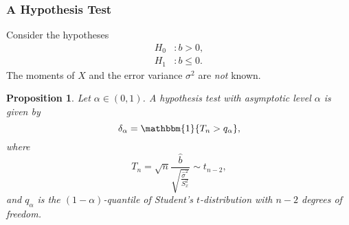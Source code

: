 \documentclass[letterpaper, reqno]{amsart}
\newtheorem{prop}{Proposition}[section]
\numberwithin{equation}{section}
\newcommand{\ddfrac}[2]{\frac{\displaystyle #1}{\displaystyle #2}}
\newcommand{\indic}[1]{\mathbbm{1}\mleft\{#1\mright\}} %
\begin{document}
\subsubsection{A Hypothesis Test}
Consider the hypotheses
\begin{align*}
  H_0 &\colon b > 0, \\
  H_1 &\colon b \le 0.
\end{align*}
The moments of $X$ and the error variance $\sigma^2$ are \emph{not} known.

\begin{prop}
  Let $\alpha \in (0, 1)$. A hypothesis test with asymptotic level $\alpha$ is
  given by
  \[ \delta_\alpha = \indic{T_n > q_\alpha}, \]
  where
  \[ T_n = \sqrt{n}\ddfrac{\hat{b}}{\sqrt{\frac{\hat{\sigma}^2}{S_x^2}}} \sim t_{n-2}, \]
  and $q_\alpha$ is the $(1-\alpha)$-quantile of Student's $t$-distribution
  with $n-2$ degrees of freedom.
\end{prop}
\end{document}
